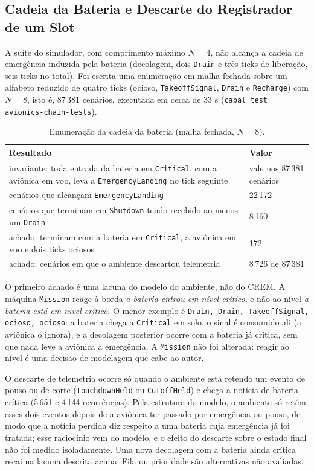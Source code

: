 \documentclass[12pt,a4paper]{article}
\begin{document}
\subsection{Cadeia da Bateria e Descarte do Registrador de um Slot}

A suíte do simulador, com comprimento máximo $N = 4$, não alcança a cadeia de emergência induzida pela bateria (decolagem, dois \texttt{Drain} e três ticks de liberação, seis ticks no total). Foi escrita uma enumeração em malha fechada sobre um alfabeto reduzido de quatro ticks (ocioso, \texttt{TakeoffSignal}, \texttt{Drain} e \texttt{Recharge}) com $N = 8$, isto é, 87\,381 cenários, executada em cerca de 33 s (\texttt{cabal test avionics-chain-tests}).

\begin{table}[h]
\centering
\footnotesize
\begin{tabular}{|p{10.4cm}|p{3.3cm}|}
\hline
Resultado & Valor \\
\hline
invariante: toda entrada da bateria em \texttt{Critical}, com a aviônica em voo, leva a \texttt{EmergencyLanding} no tick seguinte & vale nos 87\,381 cenários \\
\hline
cenários que alcançam \texttt{EmergencyLanding} & 22\,172 \\
\hline
cenários que terminam em \texttt{Shutdown} tendo recebido ao menos um \texttt{Drain} & 8\,160 \\
\hline
achado: terminam com a bateria em \texttt{Critical}, a aviônica em voo e dois ticks ociosos & 172 \\
\hline
achado: cenários em que o ambiente descartou telemetria & 8\,726 de 87\,381 \\
\hline
\end{tabular}
\caption{Enumeração da cadeia da bateria (malha fechada, $N = 8$).}
\end{table}

O primeiro achado é uma lacuna do modelo do ambiente, não do CREM. A máquina \texttt{Mission} reage à borda \textit{a bateria entrou em nível crítico}, e não ao nível \textit{a bateria está em nível crítico}. O menor exemplo é \texttt{Drain, Drain, TakeoffSignal, ocioso, ocioso}: a bateria chega a \texttt{Critical} em solo, o sinal é consumido ali (a aviônica o ignora), e a decolagem posterior ocorre com a bateria já crítica, sem que nada leve a aviônica à emergência. A \texttt{Mission} não foi alterada: reagir ao nível é uma decisão de modelagem que cabe ao autor.

O descarte de telemetria ocorre só quando o ambiente está retendo um evento de pouso ou de corte (\texttt{TouchdownHeld} ou \texttt{CutoffHeld}) e chega a notícia de bateria crítica (5\,651 e 4\,144 ocorrências). Pela estrutura do modelo, o ambiente só retém esses dois eventos depois de a aviônica ter passado por emergência ou pouso, de modo que a notícia perdida diz respeito a uma bateria cuja emergência já foi tratada; esse raciocínio vem do modelo, e o efeito do descarte sobre o estado final não foi medido isoladamente. Uma nova decolagem com a bateria ainda crítica recai na lacuna descrita acima. Fila ou prioridade são alternativas não avaliadas.
\end{document}
